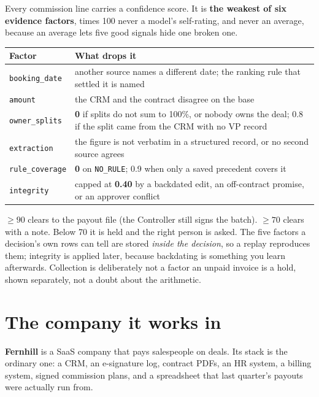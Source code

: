 \documentclass[10pt,a4paper]{article}
\newcommand{\code}[1]{{\small\texttt{#1}}}
\begin{document}
Every commission line carries a confidence score. It is \textbf{the weakest of six evidence factors}, times 100 \textemdash{} never a model's self-rating, and never an average, because an average lets five good signals hide one broken one.

\begin{tabularx}{\textwidth}{@{}p{30mm}X@{}}
\toprule
\textbf{Factor} & \textbf{What drops it}\\
\midrule
\code{booking\_date} & another source names a different date; the ranking rule that settled it is named\\
\code{amount} & the CRM and the contract disagree on the base\\
\code{owner\_splits} & \textbf{0} if splits do not sum to 100\%, or nobody owns the deal; 0.8 if the split came from the CRM with no VP record\\
\code{extraction} & the figure is not verbatim in a structured record, or no second source agrees\\
\code{rule\_coverage} & \textbf{0} on \code{NO\_RULE}; 0.9 when only a saved precedent covers it\\
\code{integrity} & capped at \textbf{0.40} by a backdated edit, an off-contract promise, or an approver conflict\\
\bottomrule
\end{tabularx}

\vspace{4pt}
$\geq 90$ clears to the payout file (the Controller still signs the batch). $\geq 70$ clears with a note. Below 70 it is held and the right person is asked. The five factors a decision's own rows can tell are stored \emph{inside the decision}, so a replay reproduces them; integrity is applied later, because backdating is something you learn afterwards. Collection is deliberately not a factor \textemdash{} an unpaid invoice is a hold, shown separately, not a doubt about the arithmetic.

\section{The company it works in}

\textbf{Fernhill} is a SaaS company that pays salespeople on deals. Its stack is the ordinary one: a CRM, an e-signature log, contract PDFs, an HR system, a billing system, signed commission plans, and a spreadsheet that last quarter's payouts were actually run from.
\end{document}
